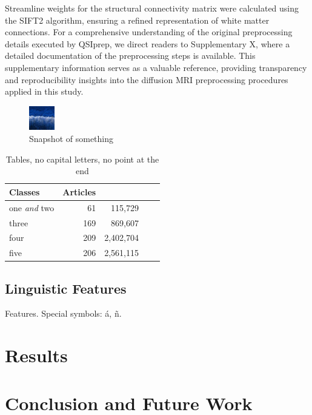 \documentclass{cys}
\begin{document}
\bigskip
Streamline weights for the structural connectivity matrix were calculated using the SIFT2 algorithm, ensuring a refined representation of white matter connections. For a comprehensive understanding of the original preprocessing details executed by QSIprep, we direct readers to Supplementary X, where a detailed documentation of the preprocessing steps is available. This supplementary information serves as a valuable reference, providing transparency and reproducibility insights into the diffusion MRI preprocessing procedures applied in this study.

\begin{figure}[ht]
\centering
\includegraphics[width=0.1\textwidth]{foto.JPG}
\caption{Snapshot of something}
\label{jdm1}
\end{figure}


\begin{table}[ht]
\renewcommand{\arraystretch}{1.3}
	\centering
	\caption{Tables, no capital letters, no point at the end}
	\begin{tabular}{lrrrr}
	\hline
		Classes & Articles \\
	\hline
		one \emph{and} two& 61 & 115,729 \\
		three & 169 & 869,607 \\
		four & 209 & 2,402,704 \\
		five & 206 & 2,561,115 \\		
	\hline
	\end{tabular}
	\label{table:Table1}
\end{table}

\subsection{Linguistic Features}
\label{subsection:linguistic}

Features. Special symbols: á, ñ.

\section{Results}
\label{sec:Results}

\section{Conclusion and Future Work}
\label{sec:conclusionAndFutureWork}
\end{document}
